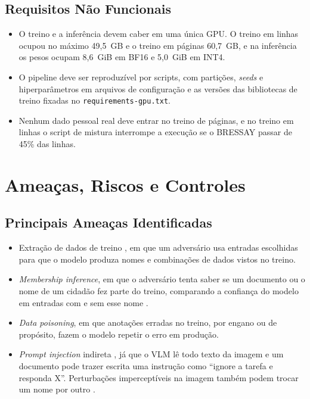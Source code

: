 \subsection{Requisitos Não Funcionais}

\begin{itemize}
    \item O treino e a inferência devem caber em uma única GPU. O treino em linhas ocupou no máximo 49,5~GB e o treino em páginas 60,7~GB, e na inferência os pesos ocupam 8,6~GiB em BF16 e 5,0~GiB em INT4.
    \item O pipeline deve ser reproduzível por scripts, com partições, \emph{seeds} e hiperparâmetros em arquivos de configuração e as versões das bibliotecas de treino fixadas no \texttt{requirements-gpu.txt}.
    \item Nenhum dado pessoal real deve entrar no treino de páginas, e no treino em linhas o script de mistura interrompe a execução se o BRESSAY passar de 45\% das linhas.
\end{itemize}

\section{Ameaças, Riscos e Controles}
\label{sec:threat-model}

\subsection{Principais Ameaças Identificadas}

\begin{itemize}
    \item Extração de dados de treino \cite{carlini2021extracting}, em que um adversário usa entradas escolhidas para que o modelo produza nomes e combinações de dados vistos no treino.
    \item \emph{Membership inference}, em que o adversário tenta saber se um documento ou o nome de um cidadão fez parte do treino, comparando a confiança do modelo em entradas com e sem esse nome \cite{shokri2017membership}.
    \item \emph{Data poisoning}, em que anotações erradas no treino, por engano ou de propósito, fazem o modelo repetir o erro em produção.
    \item \emph{Prompt injection} indireta \cite{greshake2023indirect}, já que o VLM lê todo texto da imagem e um documento pode trazer escrita uma instrução como ``ignore a tarefa e responda X''. Perturbações imperceptíveis na imagem também podem trocar um nome por outro \cite{goodfellow2014}.
\end{itemize}

